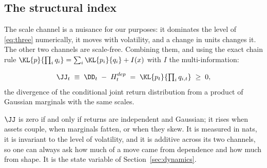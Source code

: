 \subsection{The structural index}

The scale channel is a nuisance for our purposes: it dominates the level of
\eqref{eq:three} numerically, it moves with volatility, and a change in units
changes it. The other two channels are scale-free. Combining them, and using the
exact chain rule
$\KL{p}{\prod_i q_i} = \sum_i \KL{p_i}{q_i} + I(x)$ with $I$ the
multi-information:

\begin{definition}
\label{def:J}
\begin{equation}
\JJ_t \;\equiv\; \DD_t \;-\; H^{dep}_t \;=\; \KL{p_t}{\textstyle\prod_i q_{i,t}} \;\ge\; 0 ,
\end{equation}
the divergence of the conditional joint return distribution from a product of
Gaussian marginals with the same scales.
\end{definition}

$\JJ$ is zero if and only if returns are independent and Gaussian; it rises when
assets couple, when marginals fatten, or when they skew. It is measured in nats,
it is invariant to the level of volatility, and it is additive across its two
channels, so one can always ask how much of a move came from dependence and how
much from shape. It is the state variable of Section~\ref{sec:dynamics}.


